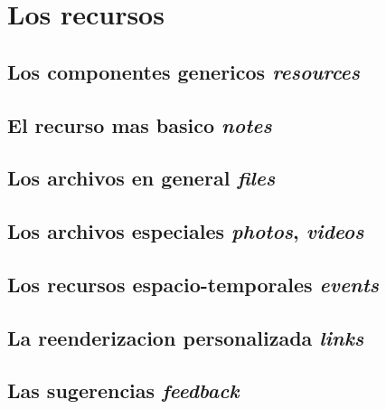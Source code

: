 \chapter{Los recursos}

\section{Los componentes genericos \emph{resources}}
\section{El recurso mas basico \emph{notes}}
\section{Los archivos en general \emph{files}}
\section{Los archivos especiales \emph{photos}, \emph{videos}}
\section{Los recursos espacio-temporales \emph{events}}
\section{La reenderizacion personalizada \emph{links}}
\section{Las sugerencias \emph{feedback}}
